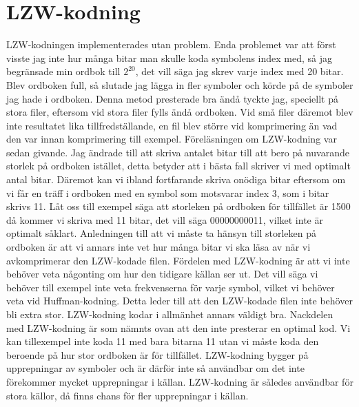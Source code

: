 \section{LZW-kodning}
LZW-kodningen implementerades utan problem. Enda problemet var att först visste jag inte hur många bitar man skulle koda symbolens index med, så jag begränsade min ordbok till ${2}^{20}$, det vill säga jag skrev varje index med 20 bitar. Blev ordboken full, så slutade jag lägga in fler symboler och körde på de symboler jag hade i ordboken. Denna metod presterade bra ändå tyckte jag, speciellt på stora filer, eftersom vid stora filer fylls ändå ordboken. Vid små filer däremot blev inte resultatet lika tillfredställande, en fil blev större vid komprimering än vad den var innan komprimering till exempel. 
Föreläsningen om LZW-kodning var sedan givande. Jag ändrade till att skriva antalet bitar till att bero på nuvarande storlek på ordboken istället, detta betyder att i bästa fall skriver vi med optimalt antal bitar. Däremot kan vi ibland fortfarande skriva onödiga bitar eftersom om vi får en träff i ordboken med en symbol som motsvarar index 3, som i bitar skrivs 11. Låt oss till exempel säga att storleken på ordboken för tillfället är 1500 då kommer vi skriva med 11 bitar, det vill säga 00000000011, vilket inte är optimalt såklart. Anledningen till att vi måste ta hänsyn till storleken på ordboken är att vi annars inte vet hur många bitar vi ska läsa av när vi avkomprimerar den LZW-kodade filen.
Fördelen med LZW-kodning är att vi inte behöver veta någonting om hur den tidigare källan ser ut. Det vill säga vi behöver till exempel inte veta frekvenserna för varje symbol, vilket vi behöver veta vid Huffman-kodning. Detta leder till att den LZW-kodade filen inte behöver bli extra stor. LZW-kodning kodar i allmänhet annars väldigt bra.
Nackdelen med LZW-kodning är som nämnts ovan att den inte presterar en optimal kod. Vi kan tillexempel inte koda 11 med bara bitarna 11 utan vi måste koda den beroende på hur stor ordboken är för tillfället. LZW-kodning bygger på upprepningar av symboler och är därför inte så användbar om det inte förekommer mycket upprepningar i källan. LZW-kodning är således användbar för stora källor, då finns chans för fler upprepningar i källan. 


